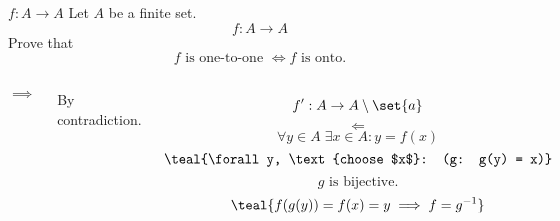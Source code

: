 \begin{frame}{}
  \begin{exampleblock}{$f: A \to A$}
    Let $A$ be a finite set.
    \[
      f: A \to A
    \]
    Prove that
    \[
      f \text{ is one-to-one } \iff f \text{ is onto}.
    \]
  \end{exampleblock}

  \pause
  \vspace{0.60cm}
  \begin{columns}
      \[
	\implies
      \]
      \centerline{By contradiction.}
      \pause
      \[
	f': A \to A \setminus \set{a}
      \]
      \pause
      \[
	\Longleftarrow
      \]
      \pause \vspace{-0.30cm}
      \[
	\forall y \in A\; \exists x \in A: y = f(x)
      \]
      \pause \vspace{-0.30cm}
      \[
	\teal{\forall y, \text{choose $x$}: (g: g(y) = x)}
      \]
      \pause \vspace{-0.30cm}
      \[
	g \text{ is bijective.}
      \]
      \pause \vspace{-0.30cm}
      \[
	\teal{f(g(y)) = f(x) = y \implies f = g^{-1}}
      \]
  \end{columns}
\end{frame}
